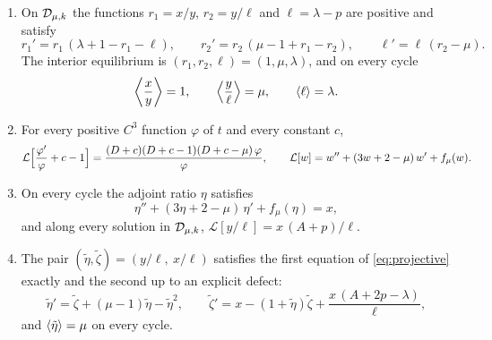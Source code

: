\begin{proposition}\label{prop:lvchain}
\begin{enumerate}[label=(\roman*)]
\item On $\mathcal D_{\mu,k}$ the functions $r_1=x/y$, $r_2=y/\ell$ and $\ell=\lambda-p$ are positive and satisfy
\begin{equation}\label{gau:lv}
r_1'=r_1\,(\lambda+1-r_1-\ell),\qquad r_2'=r_2\,(\mu-1+r_1-r_2),\qquad \ell'=\ell\,(r_2-\mu).
\end{equation}
The interior equilibrium is $(r_1,r_2,\ell)=(1,\mu,\lambda)$, and on every cycle
\begin{equation}\label{gau:lvmeans}
\left\langle \frac xy\right\rangle=1,\qquad\left\langle \frac y\ell\right\rangle=\mu,\qquad\left\langle \ell\right\rangle=\lambda .
\end{equation}
\item For every positive $C^3$ function $\varphi$ of $t$ and every constant $c$,
\begin{equation}\label{gau:colehopf}
\mathcal L\Bigl[\frac{\varphi'}{\varphi}+c-1\Bigr]=\frac{(D+c)(D+c-1)(D+c-\mu)\,\varphi}{\varphi},\qquad
\mathcal L[w]=w''+(3w+2-\mu)\,w'+f_\mu(w).
\end{equation}
\item On every cycle the adjoint ratio $\eta$ satisfies
\begin{equation}\label{gau:secondorder}
\eta''+(3\eta+2-\mu)\,\eta'+f_\mu(\eta)=x ,
\end{equation}
and along every solution in $\mathcal D_{\mu,k}$, $\mathcal L[y/\ell]=x\,(A+p)/\ell$.
\item The pair $(\tilde\eta,\tilde\zeta)=(y/\ell,\ x/\ell)$ satisfies the first equation of \eqref{eq:projective} exactly and the second up to an explicit defect:
\begin{equation}\label{gau:chainpair}
\tilde\eta'=\tilde\zeta+(\mu-1)\tilde\eta-\tilde\eta^2,\qquad
\tilde\zeta'=x-(1+\tilde\eta)\tilde\zeta+\frac{x\,(A+2p-\lambda)}{\ell},
\end{equation}
and $\left\langle \tilde\eta\right\rangle=\mu$ on every cycle.
\end{enumerate}
\end{proposition}
